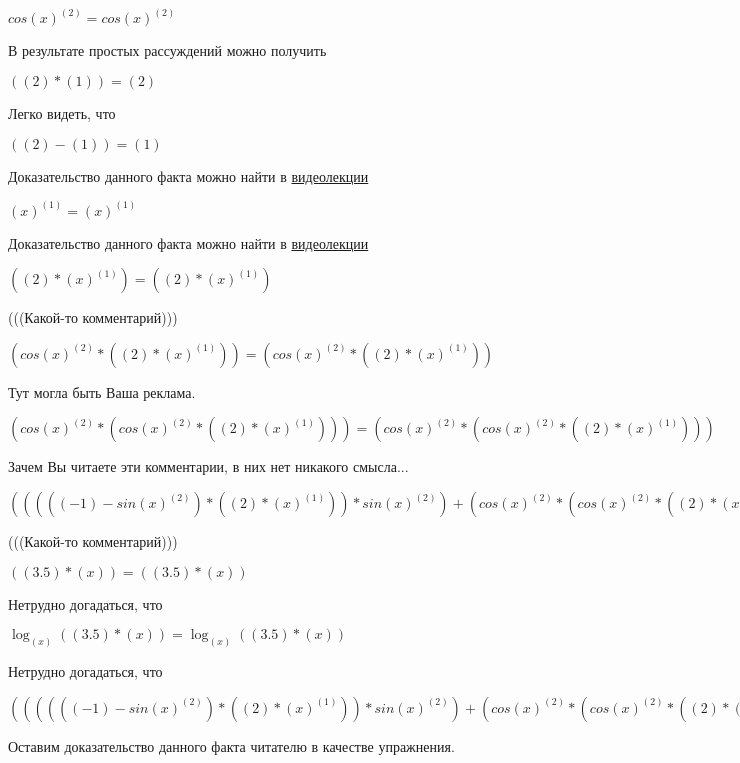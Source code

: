\documentclass[12pt,a4paper,fleqn]{article}
\theoremstyle{definition}
\begin{document}
$cos{( x )}^{( 2 )} = cos{( x )}^{( 2 )}$

В результате простых рассуждений можно получить

$(( 2 ) * ( 1 )) = ( 2 )$

Легко видеть, что

$(( 2 ) - ( 1 )) = ( 1 )$

Доказательство данного факта можно найти в \href{https://www.youtube.com/watch?v=dQw4w9WgXcQ}{видеолекции}

${( x )}^{( 1 )} = {( x )}^{( 1 )}$

Доказательство данного факта можно найти в \href{https://www.youtube.com/watch?v=dQw4w9WgXcQ}{видеолекции}

$(( 2 ) * {( x )}^{( 1 )}) = (( 2 ) * {( x )}^{( 1 )})$

(((Какой-то комментарий)))

$(cos{( x )}^{( 2 )} * (( 2 ) * {( x )}^{( 1 )})) = (cos{( x )}^{( 2 )} * (( 2 ) * {( x )}^{( 1 )}))$

Тут могла быть Ваша реклама.

$(cos{( x )}^{( 2 )} * (cos{( x )}^{( 2 )} * (( 2 ) * {( x )}^{( 1 )}))) = (cos{( x )}^{( 2 )} * (cos{( x )}^{( 2 )} * (( 2 ) * {( x )}^{( 1 )})))$

Зачем Вы читаете эти комментарии, в них нет никакого смысла...

$((((( -1 ) - sin{( x )}^{( 2 )}) * (( 2 ) * {( x )}^{( 1 )})) * sin{( x )}^{( 2 )}) + (cos{( x )}^{( 2 )} * (cos{( x )}^{( 2 )} * (( 2 ) * {( x )}^{( 1 )})))) = ((((( -1 ) - sin{( x )}^{( 2 )}) * (( 2 ) * {( x )}^{( 1 )})) * sin{( x )}^{( 2 )}) + (cos{( x )}^{( 2 )} * (cos{( x )}^{( 2 )} * (( 2 ) * {( x )}^{( 1 )}))))$

(((Какой-то комментарий)))

$(( 3.5 ) * ( x )) = (( 3.5 ) * ( x ))$

Нетрудно догадаться, что

$\log_{( x )}{(( 3.5 ) * ( x ))} = \log_{( x )}{(( 3.5 ) * ( x ))}$

Нетрудно догадаться, что

$(((((( -1 ) - sin{( x )}^{( 2 )}) * (( 2 ) * {( x )}^{( 1 )})) * sin{( x )}^{( 2 )}) + (cos{( x )}^{( 2 )} * (cos{( x )}^{( 2 )} * (( 2 ) * {( x )}^{( 1 )})))) * \log_{( x )}{(( 3.5 ) * ( x ))}) = (((((( -1 ) - sin{( x )}^{( 2 )}) * (( 2 ) * {( x )}^{( 1 )})) * sin{( x )}^{( 2 )}) + (cos{( x )}^{( 2 )} * (cos{( x )}^{( 2 )} * (( 2 ) * {( x )}^{( 1 )})))) * \log_{( x )}{(( 3.5 ) * ( x ))})$

Оставим доказательство данного факта читателю в качестве упражнения.
\end{document}
